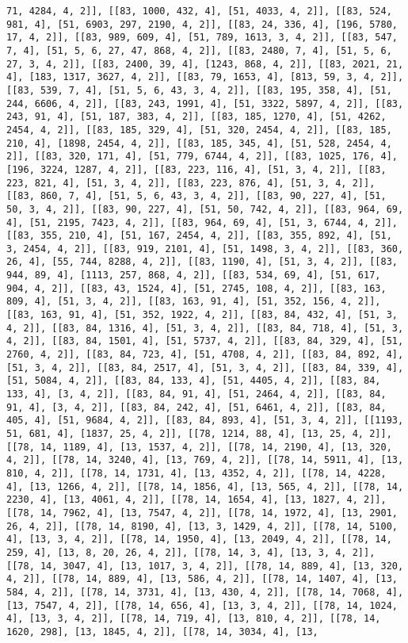 \documentclass[12pt,fleqn]{article}\usepackage{../../common}
\begin{document}
\begin{verbatim}
71, 4284, 4, 2]], [[83, 1000, 432, 4], [51, 4033, 4, 2]], [[83, 524, 981, 4], [51, 6903, 297, 2190, 4, 2]], [[83, 24, 336, 4], [196, 5780, 17, 4, 2]], [[83, 989, 609, 4], [51, 789, 1613, 3, 4, 2]], [[83, 547, 7, 4], [51, 5, 6, 27, 47, 868, 4, 2]], [[83, 2480, 7, 4], [51, 5, 6, 27, 3, 4, 2]], [[83, 2400, 39, 4], [1243, 868, 4, 2]], [[83, 2021, 21, 4], [183, 1317, 3627, 4, 2]], [[83, 79, 1653, 4], [813, 59, 3, 4, 2]], [[83, 539, 7, 4], [51, 5, 6, 43, 3, 4, 2]], [[83, 195, 358, 4], [51, 244, 6606, 4, 2]], [[83, 243, 1991, 4], [51, 3322, 5897, 4, 2]], [[83, 243, 91, 4], [51, 187, 383, 4, 2]], [[83, 185, 1270, 4], [51, 4262, 2454, 4, 2]], [[83, 185, 329, 4], [51, 320, 2454, 4, 2]], [[83, 185, 210, 4], [1898, 2454, 4, 2]], [[83, 185, 345, 4], [51, 528, 2454, 4, 2]], [[83, 320, 171, 4], [51, 779, 6744, 4, 2]], [[83, 1025, 176, 4], [196, 3224, 1287, 4, 2]], [[83, 223, 116, 4], [51, 3, 4, 2]], [[83, 223, 821, 4], [51, 3, 4, 2]], [[83, 223, 876, 4], [51, 3, 4, 2]], [[83, 860, 7, 4], [51, 5, 6, 43, 3, 4, 2]], [[83, 90, 227, 4], [51, 50, 3, 4, 2]], [[83, 90, 227, 4], [51, 50, 742, 4, 2]], [[83, 964, 69, 4], [51, 2195, 7423, 4, 2]], [[83, 964, 69, 4], [51, 3, 6744, 4, 2]], [[83, 355, 210, 4], [51, 167, 2454, 4, 2]], [[83, 355, 892, 4], [51, 3, 2454, 4, 2]], [[83, 919, 2101, 4], [51, 1498, 3, 4, 2]], [[83, 360, 26, 4], [55, 744, 8288, 4, 2]], [[83, 1190, 4], [51, 3, 4, 2]], [[83, 944, 89, 4], [1113, 257, 868, 4, 2]], [[83, 534, 69, 4], [51, 617, 904, 4, 2]], [[83, 43, 1524, 4], [51, 2745, 108, 4, 2]], [[83, 163, 809, 4], [51, 3, 4, 2]], [[83, 163, 91, 4], [51, 352, 156, 4, 2]], [[83, 163, 91, 4], [51, 352, 1922, 4, 2]], [[83, 84, 432, 4], [51, 3, 4, 2]], [[83, 84, 1316, 4], [51, 3, 4, 2]], [[83, 84, 718, 4], [51, 3, 4, 2]], [[83, 84, 1501, 4], [51, 5737, 4, 2]], [[83, 84, 329, 4], [51, 2760, 4, 2]], [[83, 84, 723, 4], [51, 4708, 4, 2]], [[83, 84, 892, 4], [51, 3, 4, 2]], [[83, 84, 2517, 4], [51, 3, 4, 2]], [[83, 84, 339, 4], [51, 5084, 4, 2]], [[83, 84, 133, 4], [51, 4405, 4, 2]], [[83, 84, 133, 4], [3, 4, 2]], [[83, 84, 91, 4], [51, 2464, 4, 2]], [[83, 84, 91, 4], [3, 4, 2]], [[83, 84, 242, 4], [51, 6461, 4, 2]], [[83, 84, 405, 4], [51, 9684, 4, 2]], [[83, 84, 893, 4], [51, 3, 4, 2]], [[1193, 51, 681, 4], [1837, 25, 4, 2]], [[78, 1214, 88, 4], [13, 25, 4, 2]], [[78, 14, 1189, 4], [13, 1537, 4, 2]], [[78, 14, 2190, 4], [13, 320, 4, 2]], [[78, 14, 3240, 4], [13, 769, 4, 2]], [[78, 14, 5911, 4], [13, 810, 4, 2]], [[78, 14, 1731, 4], [13, 4352, 4, 2]], [[78, 14, 4228, 4], [13, 1266, 4, 2]], [[78, 14, 1856, 4], [13, 565, 4, 2]], [[78, 14, 2230, 4], [13, 4061, 4, 2]], [[78, 14, 1654, 4], [13, 1827, 4, 2]], [[78, 14, 7962, 4], [13, 7547, 4, 2]], [[78, 14, 1972, 4], [13, 2901, 26, 4, 2]], [[78, 14, 8190, 4], [13, 3, 1429, 4, 2]], [[78, 14, 5100, 4], [13, 3, 4, 2]], [[78, 14, 1950, 4], [13, 2049, 4, 2]], [[78, 14, 259, 4], [13, 8, 20, 26, 4, 2]], [[78, 14, 3, 4], [13, 3, 4, 2]], [[78, 14, 3047, 4], [13, 1017, 3, 4, 2]], [[78, 14, 889, 4], [13, 320, 4, 2]], [[78, 14, 889, 4], [13, 586, 4, 2]], [[78, 14, 1407, 4], [13, 584, 4, 2]], [[78, 14, 3731, 4], [13, 430, 4, 2]], [[78, 14, 7068, 4], [13, 7547, 4, 2]], [[78, 14, 656, 4], [13, 3, 4, 2]], [[78, 14, 1024, 4], [13, 3, 4, 2]], [[78, 14, 719, 4], [13, 810, 4, 2]], [[78, 14, 1620, 298], [13, 1845, 4, 2]], [[78, 14, 3034, 4], [13, 
\end{verbatim}
\end{document}
